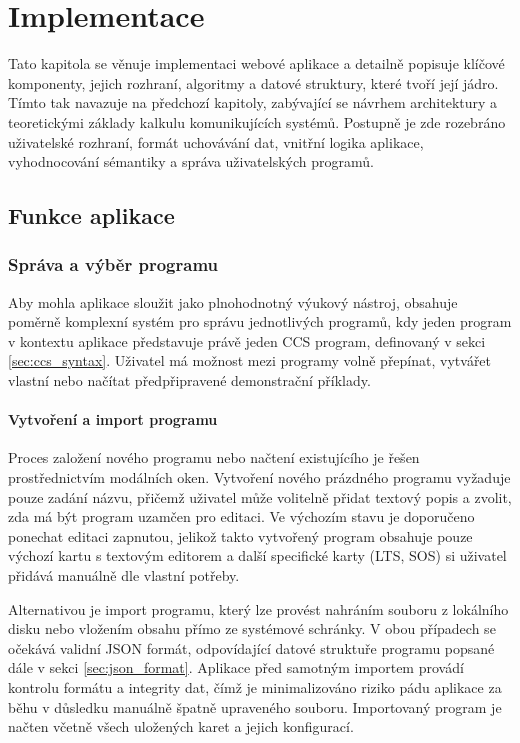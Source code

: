 \chapter{Implementace}
\label{sec:implementace}

Tato kapitola se věnuje implementaci webové aplikace a detailně popisuje klíčové komponenty, jejich rozhraní, algoritmy a datové struktury, které tvoří její jádro. 
Tímto tak navazuje na předchozí kapitoly, zabývající se návrhem architektury a teoretickými základy kalkulu komunikujících systémů. 
Postupně je zde rozebráno uživatelské rozhraní, formát uchovávání dat, vnitřní logika aplikace, vyhodnocování sémantiky a správa uživatelských programů.



\section{Funkce aplikace}
\label{sec:funkce_aplikace}

\subsection{Správa a výběr programu}
\label{sec:sprava_programu}
Aby mohla aplikace sloužit jako plnohodnotný výukový nástroj, obsahuje poměrně komplexní systém pro správu jednotlivých programů, kdy jeden program v kontextu aplikace představuje právě jeden CCS program, definovaný v sekci \ref{sec:ccs_syntax}. 
Uživatel má možnost mezi programy volně přepínat, vytvářet vlastní nebo načítat předpřipravené demonstrační příklady.

\subsubsection*{Vytvoření a import programu}
Proces založení nového programu nebo načtení existujícího je řešen prostřednictvím modálních oken. 
Vytvoření nového prázdného programu vyžaduje pouze zadání názvu, přičemž uživatel může volitelně přidat textový popis a zvolit, zda má být program uzamčen pro editaci. 
Ve výchozím stavu je doporučeno ponechat editaci zapnutou, jelikož takto vytvořený program obsahuje pouze výchozí kartu s textovým editorem a další specifické karty (LTS, SOS) si uživatel přidává manuálně dle vlastní potřeby.

Alternativou je import programu, který lze provést nahráním souboru z lokálního disku nebo vložením obsahu přímo ze systémové schránky. 
V obou případech se očekává validní JSON formát, odpovídající datové struktuře programu popsané dále v sekci \ref{sec:json_format}. 
Aplikace před samotným importem provádí kontrolu formátu a integrity dat, čímž je minimalizováno riziko pádu aplikace za běhu v důsledku manuálně špatně upraveného souboru. 
Importovaný program je načten včetně všech uložených karet a jejich konfigurací.

